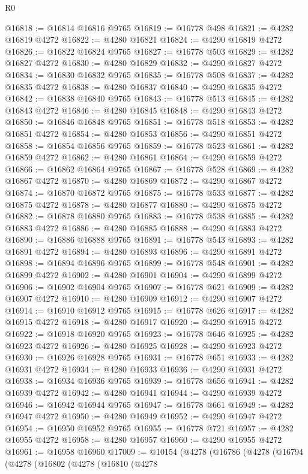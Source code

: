 \begin{lexlean}{R0}
\begin{coremodule}
@16818 := @16814 @16816 @9765
@16819 := @16778 @498
@16821 := @4282 @16819 @4272
@16822 := @4280 @16821
@16824 := @4290 @16819 @4272
@16826 := @16822 @16824 @9765
@16827 := @16778 @503
@16829 := @4282 @16827 @4272
@16830 := @4280 @16829
@16832 := @4290 @16827 @4272
@16834 := @16830 @16832 @9765
@16835 := @16778 @508
@16837 := @4282 @16835 @4272
@16838 := @4280 @16837
@16840 := @4290 @16835 @4272
@16842 := @16838 @16840 @9765
@16843 := @16778 @513
@16845 := @4282 @16843 @4272
@16846 := @4280 @16845
@16848 := @4290 @16843 @4272
@16850 := @16846 @16848 @9765
@16851 := @16778 @518
@16853 := @4282 @16851 @4272
@16854 := @4280 @16853
@16856 := @4290 @16851 @4272
@16858 := @16854 @16856 @9765
@16859 := @16778 @523
@16861 := @4282 @16859 @4272
@16862 := @4280 @16861
@16864 := @4290 @16859 @4272
@16866 := @16862 @16864 @9765
@16867 := @16778 @528
@16869 := @4282 @16867 @4272
@16870 := @4280 @16869
@16872 := @4290 @16867 @4272
@16874 := @16870 @16872 @9765
@16875 := @16778 @533
@16877 := @4282 @16875 @4272
@16878 := @4280 @16877
@16880 := @4290 @16875 @4272
@16882 := @16878 @16880 @9765
@16883 := @16778 @538
@16885 := @4282 @16883 @4272
@16886 := @4280 @16885
@16888 := @4290 @16883 @4272
@16890 := @16886 @16888 @9765
@16891 := @16778 @543
@16893 := @4282 @16891 @4272
@16894 := @4280 @16893
@16896 := @4290 @16891 @4272
@16898 := @16894 @16896 @9765
@16899 := @16778 @548
@16901 := @4282 @16899 @4272
@16902 := @4280 @16901
@16904 := @4290 @16899 @4272
@16906 := @16902 @16904 @9765
@16907 := @16778 @621
@16909 := @4282 @16907 @4272
@16910 := @4280 @16909
@16912 := @4290 @16907 @4272
@16914 := @16910 @16912 @9765
@16915 := @16778 @626
@16917 := @4282 @16915 @4272
@16918 := @4280 @16917
@16920 := @4290 @16915 @4272
@16922 := @16918 @16920 @9765
@16923 := @16778 @646
@16925 := @4282 @16923 @4272
@16926 := @4280 @16925
@16928 := @4290 @16923 @4272
@16930 := @16926 @16928 @9765
@16931 := @16778 @651
@16933 := @4282 @16931 @4272
@16934 := @4280 @16933
@16936 := @4290 @16931 @4272
@16938 := @16934 @16936 @9765
@16939 := @16778 @656
@16941 := @4282 @16939 @4272
@16942 := @4280 @16941
@16944 := @4290 @16939 @4272
@16946 := @16942 @16944 @9765
@16947 := @16778 @661
@16949 := @4282 @16947 @4272
@16950 := @4280 @16949
@16952 := @4290 @16947 @4272
@16954 := @16950 @16952 @9765
@16955 := @16778 @721
@16957 := @4282 @16955 @4272
@16958 := @4280 @16957
@16960 := @4290 @16955 @4272
@16961 := @16958 @16960
@17009 := @10154
    (@4278
      (@16786
        (@4278
          (@16794
            (@4278
              (@16802
                (@4278
                  (@16810
                    (@4278

\end{coremodule}
\end{lexlean}
